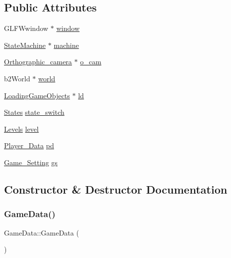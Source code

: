 \subsection*{Public Attributes}
\begin{DoxyCompactItemize}
\item 
G\+L\+F\+Wwindow $\ast$ \hyperlink{structGameData_af9735787501e4c8c1d26787c322cd6dd}{window}
\item 
\hyperlink{classStateMachine}{State\+Machine} $\ast$ \hyperlink{structGameData_a22d18ba95d18acdf0e77c8c1591c1ec7}{machine}
\item 
\hyperlink{classOrthographic__camera}{Orthographic\+\_\+camera} $\ast$ \hyperlink{structGameData_a9e133f6b5e0d19889e94505db479ca69}{o\+\_\+cam}
\item 
b2\+World $\ast$ \hyperlink{structGameData_a937e7f0334daf0f54ae28d7b92e7cca6}{world}
\item 
\hyperlink{classLoadingGameObjects}{Loading\+Game\+Objects} $\ast$ \hyperlink{structGameData_aaaddd2c1ea34ab4acc9a732879fd92ab}{ld}
\item 
\hyperlink{GameData_8h_a808e5cd4979462d3bbe3070d7d147444}{States} \hyperlink{structGameData_a210154898f11f1d892bd37644290af74}{state\+\_\+switch}
\item 
\hyperlink{GameData_8h_ae06cf0c67532073a49f95f03488d29bf}{Levels} \hyperlink{structGameData_a3dab533c5379ac113066c439f7218967}{level}
\item 
\hyperlink{structPlayer__Data}{Player\+\_\+\+Data} \hyperlink{structGameData_a698738ca3ba6be3f74700c589c63fb3d}{pd}
\item 
\hyperlink{structGame__Setting}{Game\+\_\+\+Setting} \hyperlink{structGameData_ad425129b9abf553f835bf54dd21cd2e5}{gs}
\end{DoxyCompactItemize}


\subsection{Constructor \& Destructor Documentation}
\mbox{\label{structGameData_a67ab18c5a35df618e99983275c7552ab}} 
\subsubsection{\texorpdfstring{Game\+Data()}{GameData()}\hspace{0.1cm}{\footnotesize\ttfamily [1/3]}}
{\footnotesize\ttfamily Game\+Data\+::\+Game\+Data (\begin{DoxyParamCaption}{ }\end{DoxyParamCaption})\hspace{0.3cm}{\ttfamily [inline]}}

